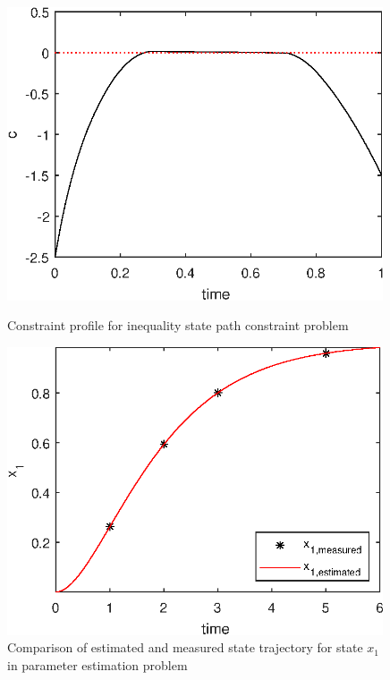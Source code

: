 \begin{figure}[htb]
\begin{minipage}[t]{0.5\linewidth}
\end{minipage}
\begin{minipage}[t]{0.5\linewidth}
\centering
\includegraphics[width=0.99\textwidth,clip]{examples/problem3/graphs/c_627a.eps}
\caption[Tutorial example 4: constraints]{Constraint profile for
  inequality state path constraint problem} \label{fig:prob3_c}
\end{minipage}
\begin{minipage}[t]{0.5\linewidth}
\centering
\includegraphics[width=0.99\textwidth,clip]{examples/problem8/graphs/xpa.eps}
\caption[Tutorial example 5: state profiles]{Comparison of estimated
  and measured state trajectory for state $x_{1}$ in parameter
  estimation problem} \label{fig:prob8_x} 
\end{minipage}
\end{figure}

